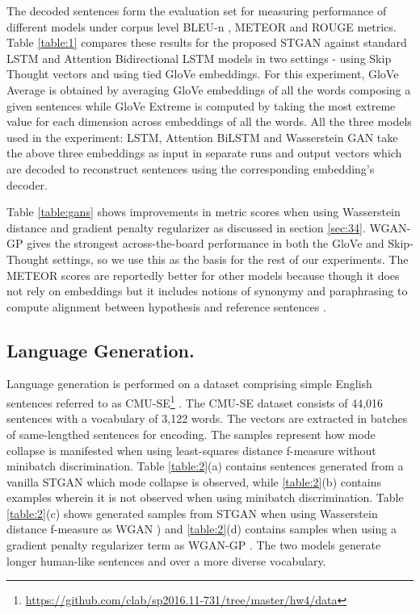 \documentclass[11pt,a4paper]{article}
\begin{document}
 The decoded sentences form the evaluation set for measuring performance of different models under corpus level BLEU-n \cite{BLEU}, METEOR \cite{meteor} and ROUGE\cite{ROUGE} metrics. Table \ref{table:1} compares these results for the proposed STGAN against standard LSTM and Attention Bidirectional LSTM models in two settings - using Skip Thought vectors and using tied GloVe \cite{glove} embeddings. For this experiment, GloVe Average is obtained by averaging GloVe embeddings of all the words composing a given sentences while GloVe Extreme is computed by taking the most extreme value for each dimension across embeddings of all the words. All the three models used in the experiment: LSTM, Attention BiLSTM and Wasserstein GAN take the above three embeddings as input in separate runs and output vectors which are decoded to reconstruct sentences using the corresponding embedding's decoder.
 
Table \ref{table:gans} shows improvements in metric scores when using Wasserstein distance and gradient penalty regularizer as discussed in section \ref{sec:34}. WGAN-GP gives the strongest across-the-board performance in both the GloVe and Skip-Thought settings, so we use this as the basis for the rest of our experiments. The METEOR scores are reportedly better for other models because though it does not rely on embeddings but it includes notions of synonymy and paraphrasing to compute alignment between hypothesis and reference sentences \cite{nlgeval}.

\subsection{Language Generation.}
Language generation is performed on a dataset comprising simple English sentences 
referred to as 
CMU-SE\footnote{\url{https://github.com/clab/sp2016.11-731/tree/master/hw4/data}} \cite{raj}. The CMU-SE dataset consists of 44,016 sentences with a vocabulary of 
3,122 words. The vectors are extracted in batches of same-lengthed sentences for encoding. 
The samples represent how mode collapse is manifested when using least-squares distance \cite{lsgan}
f-measure without minibatch discrimination. Table \ref{table:2}(a) contains sentences generated from
a vanilla STGAN which mode collapse is observed, while \ref{table:2}(b) contains examples wherein it is not observed when using minibatch discrimination.
Table \ref{table:2}(c) shows generated samples from STGAN when using Wasserstein distance 
f-measure as WGAN \cite{WGAN}) and \ref{table:2}(d) contains samples when using a gradient penalty regularizer term as WGAN-GP \cite{GulWGAN}. The two models generate longer human-like sentences and over a more diverse vocabulary.
\end{document}
